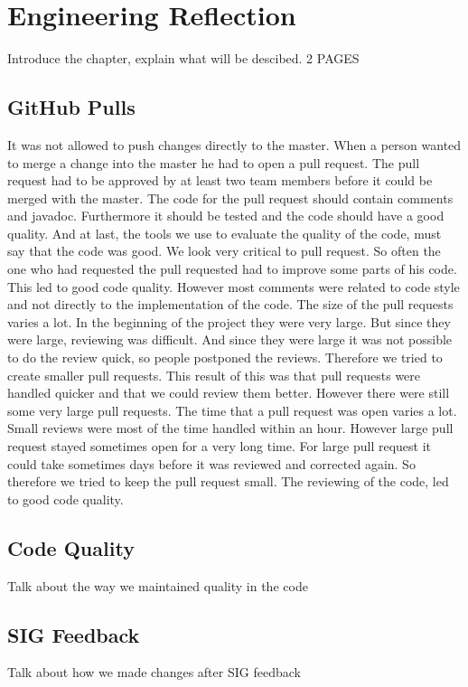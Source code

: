 \chapter{Engineering Reflection} %

Introduce the chapter, explain what will be descibed. 2 PAGES

\section{GitHub Pulls}
It was not allowed to push changes directly to the master. When a person wanted to merge a change into the master he had to open a pull request. The pull request had to be approved by at least two team members before it could be merged with the master. The code for the pull request should contain comments and javadoc. Furthermore it should be tested and the code should have a good quality. And at last, the tools we use to evaluate the quality of the code, must say that the code was good. We look very critical to pull request. So often the one who had requested the pull requested had to improve some parts of his code. This led to good code quality. However most comments were related to code style and not directly to the implementation of the code.
The size of the pull requests varies a lot. In the beginning of the project they were very large. But since they were large, reviewing was difficult. And since they were large it was not possible to do the review quick, so people postponed the reviews. Therefore we tried to create smaller pull requests. This result of this was that pull requests were handled quicker and that we could review them better. However there were still some very large pull requests.
The time that a pull request was open varies a lot. Small reviews were most of the time handled within an hour. However large pull request stayed sometimes open for a very long time. For large pull request it could take sometimes days before it was reviewed and corrected again. So therefore we tried to keep the pull request small. The reviewing of the code, led to good code quality. 
\section{Code Quality}
Talk about the way we maintained quality in the code

\section{SIG Feedback}
Talk about how we made changes after SIG feedback 